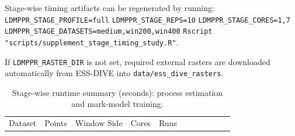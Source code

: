 \documentclass[a4paper]{report}
\begin{document}
\begin{article}
Stage-wise timing artifacts can be regenerated by running: \newline
\texttt{LDMPPR\_STAGE\_PROFILE=full} \newline
\texttt{LDMPPR\_STAGE\_REPS=10} \newline
\texttt{LDMPPR\_STAGE\_CORES=1,7} \newline
\texttt{LDMPPR\_STAGE\_DATASETS=medium,win200,win400} \newline
\texttt{Rscript "scripts/supplement\_stage\_timing\_study.R"}.

If \texttt{LDMPPR\_RASTER\_DIR} is not set, required external rasters
are downloaded automatically from ESS-DIVE into
\texttt{data/ess\_dive\_rasters}.

\begin{longtable}[]{@{}
  >{\raggedright\arraybackslash}p{}
  >{\raggedleft\arraybackslash}p{}
  >{\raggedleft\arraybackslash}p{}
  >{\raggedleft\arraybackslash}p{}
  >{\raggedleft\arraybackslash}p{}
  >{\raggedleft\arraybackslash}p{}
  >{\raggedleft\arraybackslash}p{}
  >{\raggedleft\arraybackslash}p{}
  >{\raggedleft\arraybackslash}p{}
  >{\raggedleft\arraybackslash}p{}
  >{\raggedleft\arraybackslash}p{}@{}}
\caption{Stage-wise runtime summary (seconds): process estimation and
mark-model training.}\tabularnewline
\toprule\noalign{}
\begin{minipage}[b]{\linewidth}\raggedright
Dataset
\end{minipage} & \begin{minipage}[b]{\linewidth}\raggedleft
Points
\end{minipage} & \begin{minipage}[b]{\linewidth}\raggedleft
Window Side
\end{minipage} & \begin{minipage}[b]{\linewidth}\raggedleft
Cores
\end{minipage} & \begin{minipage}[b]{\linewidth}\raggedleft
Runs
\end{minipage} & \begin{minipage}[b]{\linewidth}\raggedleft

\end{minipage}
\end{longtable}
\end{article}
\end{document}
